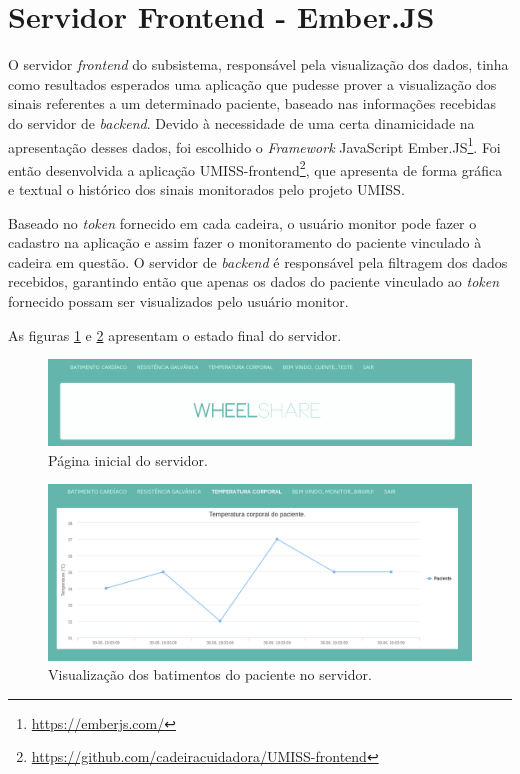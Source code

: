 \section{Servidor Frontend - Ember.JS}

O servidor \textit{frontend} do subsistema, responsável pela visualização dos
dados, tinha como resultados esperados uma aplicação que pudesse prover a
visualização dos sinais referentes a um determinado paciente, baseado nas
informações recebidas do servidor de \textit{backend}. Devido à necessidade de
uma certa dinamicidade na apresentação desses dados, foi escolhido o
\textit{Framework} JavaScript Ember.JS\footnote{\url{https://emberjs.com/}}.
Foi então desenvolvida a aplicação 
UMISS-frontend\footnote{\url{https://github.com/cadeiracuidadora/UMISS-frontend}},
que apresenta de forma gráfica e textual o histórico dos sinais monitorados pelo
projeto UMISS.

Baseado no \textit{token} fornecido em cada cadeira, o usuário monitor pode
fazer o cadastro na aplicação e assim fazer o monitoramento do
paciente vinculado à cadeira em questão. O servidor de \textit{backend} é
responsável pela filtragem dos dados recebidos, garantindo então que apenas os
dados do paciente vinculado ao \textit{token} fornecido possam ser visualizados
pelo usuário monitor.

As figuras \ref{fig:wheelshare1} e \ref{fig:wheelshare2}
apresentam o estado final do servidor.

\begin{figure}[h!]
    \begin{center}
        \includegraphics[width=\textwidth]{figuras/wheelshare1.png}
    \end{center}
    \caption{Página inicial do servidor.}
    \label{fig:wheelshare1}
\end{figure}

\begin{figure}[h!]
    \begin{center}
        \includegraphics[width=\textwidth]{figuras/wheelshare2.png}
    \end{center}
    \caption{Visualização dos batimentos do paciente no servidor.}
    \label{fig:wheelshare2}
\end{figure}


